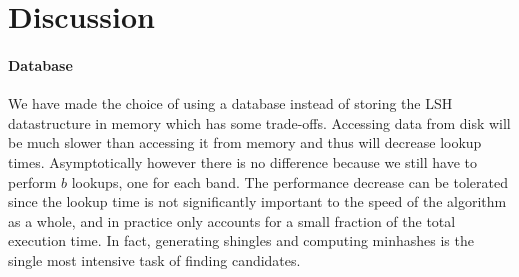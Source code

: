 \section{Discussion}


\paragraph{Database}
We have made the choice of using a database instead of storing the LSH datastructure in memory which has some trade-offs. Accessing data from disk will be much slower than accessing it from memory and thus will decrease lookup times. Asymptotically however there is no difference because we still have to perform $b$ lookups, one for each band. The performance decrease can be tolerated since the lookup time is not significantly important to the speed of the algorithm as a whole, and in practice only accounts for a small fraction of the total execution time. In fact, generating shingles and computing minhashes is the single most intensive task of finding candidates.





